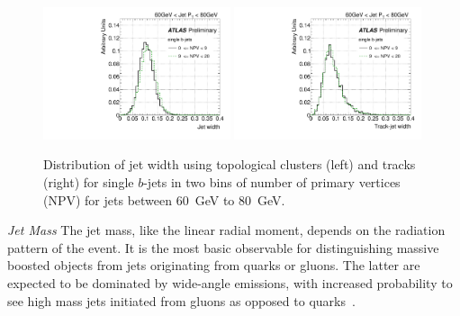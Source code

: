 \begin{figure}[tp]
\centering
\includegraphics[width=0.49\textwidth]{FIGS/systematics/Widthsingle_060.pdf}
\includegraphics[width=0.49\textwidth]{FIGS/systematics/trkWidthsingle_060.pdf}
\caption{Distribution of jet width using topological clusters (left) and tracks (right) for single $b$-jets in two bins of number of primary vertices (NPV) for jets between 60~GeV to 80~GeV.}
\label{fig:trkwidthpileup}
\end{figure}


{ \em Jet Mass} The jet mass, like the linear radial moment, depends on the radiation pattern of the event. It is the most basic observable for distinguishing massive boosted objects from jets originating from quarks or gluons. The latter are expected to be dominated by wide-angle emissions, with increased probability to see high mass jets initiated from gluons as opposed to quarks~\cite{PhysRevD.79.074012}.  

